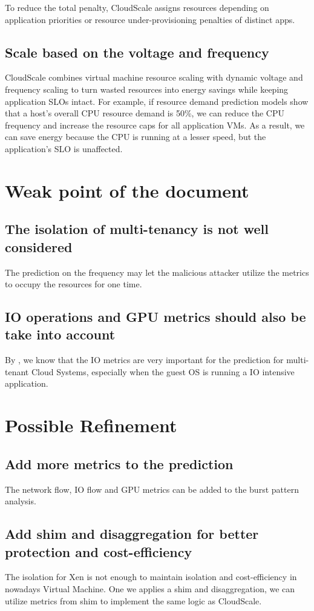 \documentclass[acmlarge]{acmart}
\begin{document}
To reduce the total penalty, CloudScale assigns resources depending on application priorities or resource under-provisioning penalties of distinct apps.
\subsection{Scale based on the voltage and frequency}
CloudScale combines virtual machine resource scaling with dynamic voltage and frequency scaling to turn wasted resources into energy savings while keeping application SLOs intact. For example, if resource demand prediction models show that a host's overall CPU resource demand is 50\%, we can reduce the CPU frequency and increase the resource caps for all application VMs. As a result, we can save energy because the CPU is running at a lesser speed, but the application's SLO is unaffected.
\section{Weak point of the document}
\subsection{The isolation of multi-tenancy is not well considered}
The prediction on the frequency may let the malicious attacker utilize the metrics to occupy the resources for one time.
\subsection{IO operations and GPU metrics should also be take into account}
By \cite{kim2015towards}, we know that the IO metrics are very important for the prediction for multi-tenant Cloud Systems, especially when the guest OS is running a IO intensive application.
\section{Possible Refinement}
\subsection{Add more metrics to the prediction}
The network flow, IO flow and GPU metrics can be added to the burst pattern analysis.
\subsection{Add shim and disaggregation for better protection and cost-efficiency}
The isolation for Xen is not enough to maintain isolation and cost-efficiency in nowadays Virtual Machine. One we applies a shim and disaggregation, we can utilize metrics from shim to implement the same logic as CloudScale.


\end{document}
